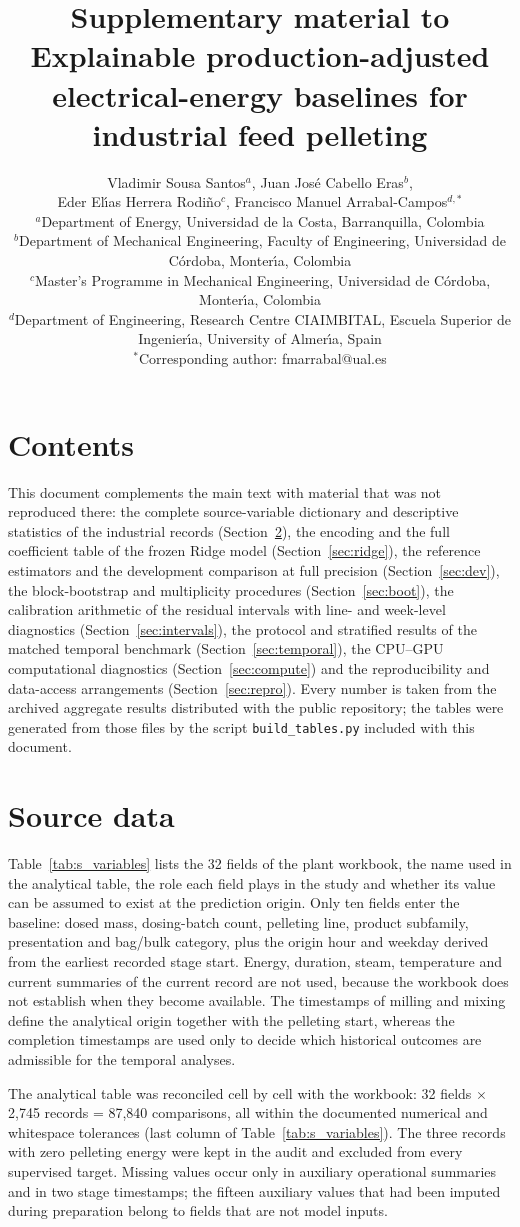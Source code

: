 \documentclass[11pt,a4paper]{article}
\title{\vspace{-2em}\large Supplementary material to\\[4pt]\Large\bfseries Explainable production-adjusted electrical-energy baselines for industrial feed pelleting}
\author{\normalsize Vladimir Sousa Santos$^{a}$, Juan Jos\'e Cabello Eras$^{b}$,\\ \normalsize Eder El\'{\i}as Herrera Rodi\~no$^{c}$, Francisco Manuel Arrabal-Campos$^{d,*}$\\[4pt]
\footnotesize $^{a}$Department of Energy, Universidad de la Costa, Barranquilla, Colombia\\
\footnotesize $^{b}$Department of Mechanical Engineering, Faculty of Engineering, Universidad de C\'ordoba, Monter\'{\i}a, Colombia\\
\footnotesize $^{c}$Master's Programme in Mechanical Engineering, Universidad de C\'ordoba, Monter\'{\i}a, Colombia\\
\footnotesize $^{d}$Department of Engineering, Research Centre CIAIMBITAL, Escuela Superior de Ingenier\'{\i}a, University of Almer\'{\i}a, Spain\\
\footnotesize $^{*}$Corresponding author: fmarrabal@ual.es}
\date{}
\begin{document}
\maketitle

\section{Contents}
This document complements the main text with material that was not reproduced there: the complete source-variable dictionary and descriptive statistics of the industrial records (Section~\ref{sec:data}), the encoding and the full coefficient table of the frozen Ridge model (Section~\ref{sec:ridge}), the reference estimators and the development comparison at full precision (Section~\ref{sec:dev}), the block-bootstrap and multiplicity procedures (Section~\ref{sec:boot}), the calibration arithmetic of the residual intervals with line- and week-level diagnostics (Section~\ref{sec:intervals}), the protocol and stratified results of the matched temporal benchmark (Section~\ref{sec:temporal}), the CPU--GPU computational diagnostics (Section~\ref{sec:compute}) and the reproducibility and data-access arrangements (Section~\ref{sec:repro}). Every number is taken from the archived aggregate results distributed with the public repository; the tables were generated from those files by the script \texttt{build\_tables.py} included with this document.

\section{Source data}\label{sec:data}
Table~\ref{tab:s_variables} lists the 32 fields of the plant workbook, the name used in the analytical table, the role each field plays in the study and whether its value can be assumed to exist at the prediction origin. Only ten fields enter the baseline: dosed mass, dosing-batch count, pelleting line, product subfamily, presentation and bag/bulk category, plus the origin hour and weekday derived from the earliest recorded stage start. Energy, duration, steam, temperature and current summaries of the current record are not used, because the workbook does not establish when they become available. The timestamps of milling and mixing define the analytical origin together with the pelleting start, whereas the completion timestamps are used only to decide which historical outcomes are admissible for the temporal analyses.

The analytical table was reconciled cell by cell with the workbook: 32 fields $\times$ 2,745 records = 87,840 comparisons, all within the documented numerical and whitespace tolerances (last column of Table~\ref{tab:s_variables}). The three records with zero pelleting energy were kept in the audit and excluded from every supervised target. Missing values occur only in auxiliary operational summaries and in two stage timestamps; the fifteen auxiliary values that had been imputed during preparation belong to fields that are not model inputs.
\end{document}

